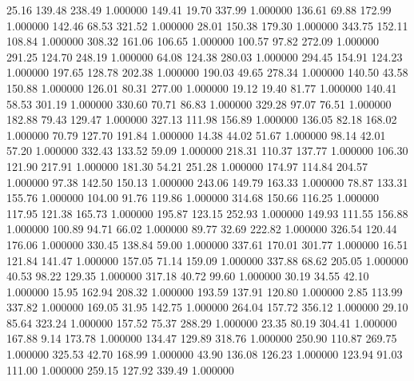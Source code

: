      25.16    139.48    238.49  1.000000
    149.41     19.70    337.99  1.000000
    136.61     69.88    172.99  1.000000
    142.46     68.53    321.52  1.000000
     28.01    150.38    179.30  1.000000
    343.75    152.11    108.84  1.000000
    308.32    161.06    106.65  1.000000
    100.57     97.82    272.09  1.000000
    291.25    124.70    248.19  1.000000
     64.08    124.38    280.03  1.000000
    294.45    154.91    124.23  1.000000
    197.65    128.78    202.38  1.000000
    190.03     49.65    278.34  1.000000
    140.50     43.58    150.88  1.000000
    126.01     80.31    277.00  1.000000
     19.12     19.40     81.77  1.000000
    140.41     58.53    301.19  1.000000
    330.60     70.71     86.83  1.000000
    329.28     97.07     76.51  1.000000
    182.88     79.43    129.47  1.000000
    327.13    111.98    156.89  1.000000
    136.05     82.18    168.02  1.000000
     70.79    127.70    191.84  1.000000
     14.38     44.02     51.67  1.000000
     98.14     42.01     57.20  1.000000
    332.43    133.52     59.09  1.000000
    218.31    110.37    137.77  1.000000
    106.30    121.90    217.91  1.000000
    181.30     54.21    251.28  1.000000
    174.97    114.84    204.57  1.000000
     97.38    142.50    150.13  1.000000
    243.06    149.79    163.33  1.000000
     78.87    133.31    155.76  1.000000
    104.00     91.76    119.86  1.000000
    314.68    150.66    116.25  1.000000
    117.95    121.38    165.73  1.000000
    195.87    123.15    252.93  1.000000
    149.93    111.55    156.88  1.000000
    100.89     94.71     66.02  1.000000
     89.77     32.69    222.82  1.000000
    326.54    120.44    176.06  1.000000
    330.45    138.84     59.00  1.000000
    337.61    170.01    301.77  1.000000
     16.51    121.84    141.47  1.000000
    157.05     71.14    159.09  1.000000
    337.88     68.62    205.05  1.000000
     40.53     98.22    129.35  1.000000
    317.18     40.72     99.60  1.000000
     30.19     34.55     42.10  1.000000
     15.95    162.94    208.32  1.000000
    193.59    137.91    120.80  1.000000
      2.85    113.99    337.82  1.000000
    169.05     31.95    142.75  1.000000
    264.04    157.72    356.12  1.000000
     29.10     85.64    323.24  1.000000
    157.52     75.37    288.29  1.000000
     23.35     80.19    304.41  1.000000
    167.88      9.14    173.78  1.000000
    134.47    129.89    318.76  1.000000
    250.90    110.87    269.75  1.000000
    325.53     42.70    168.99  1.000000
     43.90    136.08    126.23  1.000000
    123.94     91.03    111.00  1.000000
    259.15    127.92    339.49  1.000000
